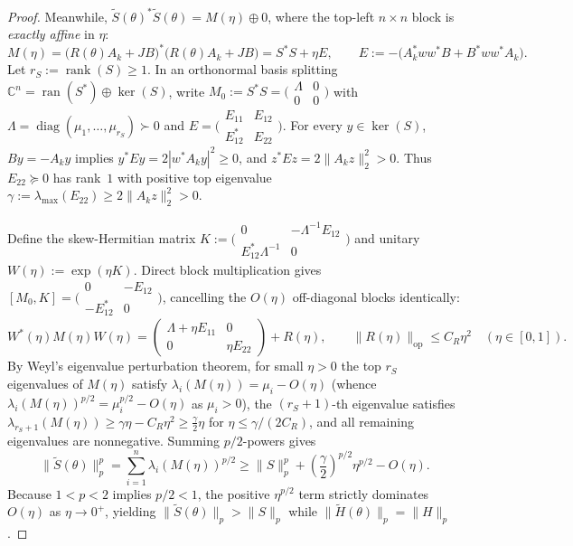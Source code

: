 \documentclass[10pt,letterpaper]{article}
\newcommand{\C}{\mathbb{C}}
\newcommand{\ran}{\operatorname{ran}}
\newcommand{\rank}{\operatorname{rank}}
\newcommand{\diag}{\operatorname{diag}}
\newcommand{\op}{\mathrm{op}}
\begin{document}
\begin{proof}
Meanwhile, $\widetilde{S}(\theta)^* \widetilde{S}(\theta) = M(\eta) \oplus 0$, where the top-left $n\times n$ block is \emph{exactly affine} in $\eta$:
\[
  M(\eta) = \bigl(R(\theta) A_k + JB\bigr)^*\bigl(R(\theta) A_k + JB\bigr) = S^* S + \eta E,
  \qquad E := -\bigl(A_k^* w w^* B + B^* w w^* A_k\bigr).
\]
Let $r_S := \rank(S) \ge 1$. In an orthonormal basis splitting $\C^n = \ran(S^*) \oplus \ker(S)$, write $M_0 := S^* S = \bigl(\begin{smallmatrix} \Lambda & 0 \\ 0 & 0 \end{smallmatrix}\bigr)$ with $\Lambda = \diag(\mu_1,\dots,\mu_{r_S}) \succ 0$ and $E = \bigl(\begin{smallmatrix} E_{11} & E_{12} \\ E_{12}^* & E_{22} \end{smallmatrix}\bigr)$. For every $y \in \ker(S)$, $By = -A_k y$ implies $y^* E y = 2|w^* A_k y|^2 \ge 0$, and $z^* E z = 2\|A_k z\|_2^2 > 0$. Thus $E_{22} \succeq 0$ has rank~$1$ with positive top eigenvalue $\gamma := \lambda_{\max}(E_{22}) \ge 2\|A_k z\|_2^2 > 0$.

Define the skew-Hermitian matrix $K := \bigl(\begin{smallmatrix} 0 & -\Lambda^{-1} E_{12} \\ E_{12}^* \Lambda^{-1} & 0 \end{smallmatrix}\bigr)$ and unitary $W(\eta) := \exp(\eta K)$. Direct block multiplication gives $[M_0, K] = \bigl(\begin{smallmatrix} 0 & -E_{12} \\ -E_{12}^* & 0 \end{smallmatrix}\bigr)$, cancelling the $O(\eta)$ off-diagonal blocks identically:
\[
  W^*(\eta) M(\eta) W(\eta) = \begin{pmatrix} \Lambda + \eta E_{11} & 0 \\ 0 & \eta E_{22} \end{pmatrix} + R(\eta),
  \qquad \|R(\eta)\|_{\op} \le C_R \eta^2 \quad (\eta \in [0,1]).
\]
By Weyl's eigenvalue perturbation theorem, for small $\eta > 0$ the top $r_S$ eigenvalues of $M(\eta)$ satisfy $\lambda_i(M(\eta)) = \mu_i - O(\eta)$ (whence $\lambda_i(M(\eta))^{p/2} = \mu_i^{p/2} - O(\eta)$ as $\mu_i > 0$), the $(r_S + 1)$-th eigenvalue satisfies $\lambda_{r_S + 1}(M(\eta)) \ge \gamma\eta - C_R\eta^2 \ge \frac{\gamma}{2}\eta$ for $\eta \le \gamma/(2C_R)$, and all remaining eigenvalues are nonnegative. Summing $p/2$-powers gives
\[
  \|\widetilde{S}(\theta)\|_p^p = \sum_{i=1}^n \lambda_i(M(\eta))^{p/2} \ge \|S\|_p^p + \left(\frac{\gamma}{2}\right)^{p/2}\eta^{p/2} - O(\eta).
\]
Because $1 < p < 2$ implies $p/2 < 1$, the positive $\eta^{p/2}$ term strictly dominates $O(\eta)$ as $\eta \to 0^+$, yielding $\|\widetilde{S}(\theta)\|_p > \|S\|_p$ while $\|\widetilde{H}(\theta)\|_p = \|H\|_p$.
\end{proof}
\end{document}
